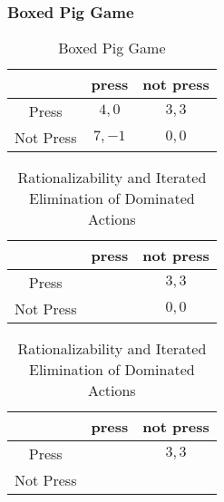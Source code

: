 \documentclass[UTF8,11pt,colorlinks,compress,openany]{beamer}%
\begin{document}
\begin{frame}\frametitle{Boxed Pig Game}
\begin{table}
\begin{tabu}{c|cc}
\hline
 & press & not press\\
\hline
Press & $4,0$ & $3,3$\\
Not Press & $7,-1$ & $0,0$\\
\hline
\end{tabu}\caption{Boxed Pig Game}
\end{table}
\begin{table}
\begin{tabu}{c|cc}
\hline
 & press & not press\\
\hline
Press &  & $3,3$\\
Not Press &  & $0,0$\\
\hline
\end{tabu}\caption{Rationalizability and Iterated Elimination of Dominated Actions}
\end{table}
\begin{table}
\begin{tabu}{c|cc}
\hline
 & press & not press\\
\hline
Press &  & $3,3$\\
Not Press &  &\\
\hline
\end{tabu}\caption{Rationalizability and Iterated Elimination of Dominated Actions}
\end{table}
\end{frame}
\end{document}
